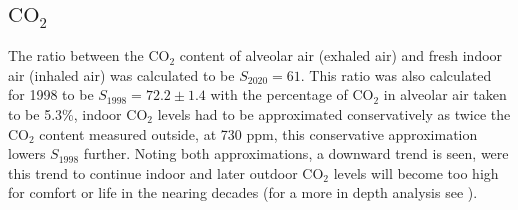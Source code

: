 \documentclass[reprint,amsmath,amssymb,aps, prl,superscriptaddress]{revtex4-2}
\begin{document}
\subsection{$\text{CO}_{2}$}
The ratio between the $\text{CO}_{2}$ content of alveolar air (exhaled air) and fresh indoor air (inhaled air) was calculated to be $S_{2020}=61$. This ratio was also calculated for 1998 to be $S_{1998}=72.2\pm1.4$ with the percentage of $\text{CO}_2$ in alveolar air taken to be 5.3\%\cite{bookWithCO2inBreath}, 
indoor $\text{CO}_2$ levels had to be approximated conservatively as twice the $\text{CO}_2$ content measured outside, at 730 ppm\cite{tans2009noaa}, this conservative approximation lowers $S_{1998}$ further. Noting both approximations, a downward trend is seen, were this trend to continue indoor and later outdoor $\text{CO}_2$ levels will become too high for comfort or life in the nearing decades (for a more in depth analysis see \cite{Jacobson2019}).
\end{document}
